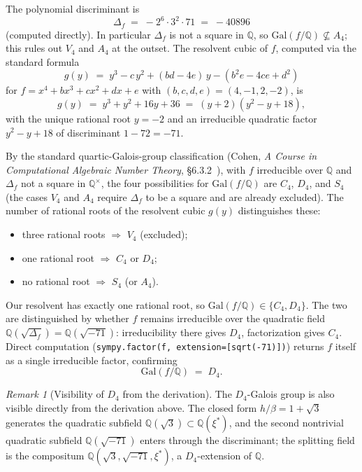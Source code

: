\documentclass[11pt,reqno]{amsart}
\theoremstyle{plain}
\theoremstyle{definition}
\theoremstyle{remark}
\newtheorem*{remark}{Remark}
\newcommand{\Q}{\mathbb{Q}}
\begin{document}
The polynomial discriminant is
\[
  \Delta_{f} \;=\; -2^{6}\cdot 3^{2}\cdot 71 \;=\; -40896
\]
(computed directly). In particular $\Delta_{f}$ is not a square in
$\Q$, so $\mathrm{Gal}(f/\Q) \not\subseteq A_{4}$; this rules out
$V_{4}$ and $A_{4}$ at the outset. The resolvent cubic of $f$, computed
via the standard formula
\[
  g(y) \;=\; y^{3} - c\,y^{2} + (bd - 4e)\,y - (b^{2}e - 4ce + d^{2})
\]
for $f = x^{4} + bx^{3} + cx^{2} + dx + e$ with $(b,c,d,e) = (4,-1,2,-2)$,
is
\[
  g(y) \;=\; y^{3} + y^{2} + 16y + 36
       \;=\; (y + 2)(y^{2} - y + 18),
\]
with the unique rational root $y = -2$ and an irreducible quadratic
factor $y^{2} - y + 18$ of discriminant $1 - 72 = -71$.

By the standard quartic-Galois-group classification (Cohen,
\textit{A Course in Computational Algebraic Number Theory},
\S6.3.2~\cite{Cohen1993}), with $f$ irreducible over $\Q$ and
$\Delta_{f}$ not a square in $\Q^{\times}$, the four possibilities for
$\mathrm{Gal}(f/\Q)$ are $C_{4}$, $D_{4}$, and $S_{4}$ (the cases
$V_{4}$ and $A_{4}$ require $\Delta_{f}$ to be a square and are
already excluded). The number of rational roots of the resolvent cubic
$g(y)$ distinguishes these:
\begin{itemize}\setlength\itemsep{0pt}
\item three rational roots $\Longrightarrow$ $V_{4}$ (excluded);
\item one rational root $\Longrightarrow$ $C_{4}$ or $D_{4}$;
\item no rational root $\Longrightarrow$ $S_{4}$ (or $A_{4}$).
\end{itemize}
Our resolvent has exactly one rational root, so
$\mathrm{Gal}(f/\Q) \in \{C_{4}, D_{4}\}$. The two are distinguished by
whether $f$ remains irreducible over the quadratic field
$\Q(\sqrt{\Delta_{f}}) = \Q(\sqrt{-71})$: irreducibility there gives
$D_{4}$, factorization gives $C_{4}$. Direct computation
(\texttt{sympy.factor(f, extension=[sqrt(-71)])}) returns $f$ itself as
a single irreducible factor, confirming
\[
  \mathrm{Gal}(f/\Q) \;=\; D_{4}.
\]

\begin{remark}[Visibility of $D_{4}$ from the derivation]
The $D_{4}$-Galois group is also visible directly from the derivation
above. The closed form $h/\beta = 1+\sqrt{3}$ generates the quadratic
subfield $\Q(\sqrt{3})\subset\Q(\xi^{*})$, and the second nontrivial
quadratic subfield $\Q(\sqrt{-71})$ enters through the discriminant;
the splitting field is the compositum
$\Q(\sqrt{3}, \sqrt{-71}, \xi^{*})$, a $D_{4}$-extension of $\Q$.
\end{remark}
\end{document}
